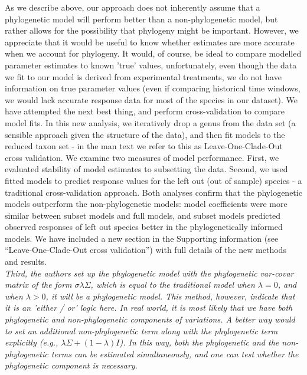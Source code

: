 \documentclass[11pt]{article}
\begin{document}
As we describe above, our approach does not inherently assume that a phylogenetic model will perform better than a non-phylogenetic model, but rather allows for the possibility that phylogeny might be important. However, we appreciate that it would be useful to know whether estimates are more accurate when we account for phylogeny. It would, of course, be ideal to compare modelled parameter estimates to known 'true' values, unfortunately, even though the data we fit to our model is derived from experimental treatments, we do not have information on true parameter values (even if comparing historical time windows, we would lack accurate response data for most of the species in our dataset). We have attempted the next best thing, and perform cross-validation to compare model fits. In this new analysis, we iteratively drop a genus from the data set (a sensible approach given the structure of the data), and then fit models to the reduced taxon set - in the man text we refer to this as Leave-One-Clade-Out cross validation. We examine two measures of model performance. First, we evaluated stability of model estimates to subsetting the data. Second, we used fitted models to predict response values for the left out (out of sample) species - a traditional cross-validation approach. Both analyses confirm that the phylogenetic models outperform the non-phylogenetic models: model coefficients were more similar between subset models and full models, and subset models predicted observed responses of left out species better in the phylogenetically informed models. We have included a new section in the Supporting information (see ``Leave-One-Clade-Out cross validation'') with full details of the new methods and results.\\

\emph{Third, the authors set up the phylogenetic model with the phylogenetic var-covar matrix of the form $\sigma\lambda\Sigma$, which is equal to the traditional model when $\lambda=0$, and when $\lambda>0$, it will be a phylogenetic model. This method, however, indicate that it is an 'either / or' logic here. In real world, it is most likely that we have both phylogenetic and non-phylogenetic components of variations. A better way would to set an additional non-phylogenetic term along with the phylogenetic term explicitly (e.g., $\lambda \Sigma + (1-\lambda)I$). In this way, both the phylogenetic and the non-phylogenetic terms can be estimated simultaneously, and one can test whether the phylogenetic component is necessary.}\\
\end{document}

